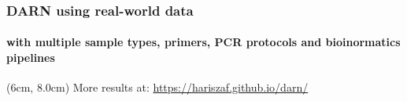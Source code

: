 \documentclass{beamer}
\begin{document}
   \begin{frame}
      \frametitle{DARN using real-world data}
      \framesubtitle{with multiple sample types, primers, PCR protocols and bioinormatics pipelines}


      \begin{textblock*}{6cm}(6cm, 8.0cm)
         \footnotesize
         More results at:
         \href{https://hariszaf.github.io/darn/}{https://hariszaf.github.io/darn/} 
      \end{textblock*}


\end{frame}
\end{document}
